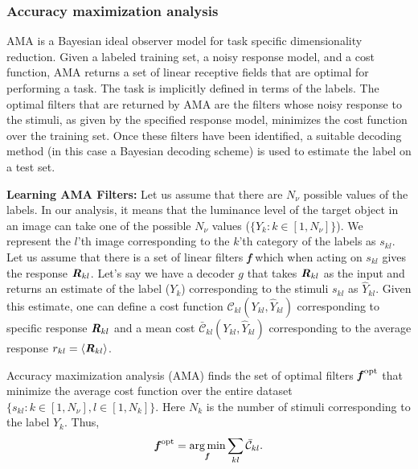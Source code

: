 \documentclass{jov}
\DeclareMathOperator*{\argmin}{arg\,min}
\begin{document}
\subsubsection*{Accuracy maximization analysis}

AMA \cite{geisler2009optimal,burge2017accuracy} is a Bayesian ideal observer model for task specific dimensionality reduction. Given a labeled training set, a noisy response model, and a cost function, AMA returns a set of linear receptive fields that are optimal for performing a task. The task is implicitly defined in terms of the labels. The optimal filters that are returned by AMA are the filters whose noisy response to the stimuli, as given by the specified response model, minimizes the cost function over the training set. Once these filters have been identified, a suitable decoding method (in this case a Bayesian decoding scheme) is used to estimate the label on a test set.

{\bf Learning AMA Filters:} Let us assume that there are $N_{\nu}$ possible values of the labels. In our analysis, it means that the luminance level of the target object in an image can take one of the possible $N_{\nu}$ values ($\{Y_k: k\in[1,N_{\nu}] \}$). We represent the $l$'th image corresponding to the $k$'th category of the labels as $s_{kl}$. Let us assume that there is a set of linear filters {\textbf{\textit f}} which when acting on $s_{kl}$ gives the response ${\textbf{\textit R}}_{kl}$. Let's say we have a decoder $g$ that takes ${\textbf{\textit R}}_{kl}$ as the input and returns an estimate of the label ($Y_k$) corresponding to the stimuli $s_{kl}$ as $\hat{Y}_{kl}$. Given this estimate, one can define a cost function $\mathcal{C}_{kl}(Y_{kl},\hat{Y}_{kl})$ corresponding to specific response ${\textbf{\textit R}}_{kl}$ and a mean cost $\bar{\mathcal{C}}_{kl}(Y_{kl},\hat{Y}_{kl})$ corresponding to the average response $r_{kl} = \langle{\textbf{\textit R}}_{kl}\rangle$. 

Accuracy maximization analysis (AMA) finds the set of optimal filters ${\textbf{\textit f}}^{\rm opt}$ that minimize the average cost function over the entire dataset $\{s_{kl}: k\in[1,N_{\nu}], l\in[1,N_k]\}$. Here $N_{k}$ is the number of stimuli corresponding to the label $Y_k$. Thus,
\begin{align}
{\textbf {\textit f} }^{\rm opt} = \argmin_{\textbf {\textit f} } \sum_{kl} \bar{\mathcal{C}}_{kl}.
\label{eq:fopt}
\end{align}
\end{document}
